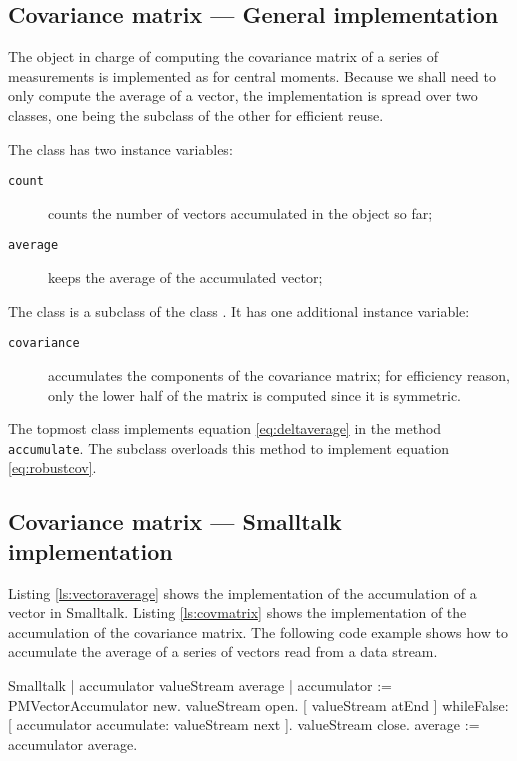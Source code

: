 \subsection{Covariance matrix --- General implementation}
 The
object in charge of computing the covariance matrix of a series of
measurements is implemented as for central moments. Because we
shall need to only compute the average of a vector, the
implementation is spread over two classes, one being the subclass
of the other for efficient reuse.

\noindent The class  has two instance
variables: {} {\parskip 0pt
\begin{description}
  \item[\texttt{count}] counts the number of vectors accumulated in the object so far;
  \item[\texttt{average}] keeps the average of the accumulated vector;
\end{description}
}

\noindent The class  is a subclass of
the class . It has one additional instance
variable: {} {\parskip 0pt
\begin{description}
  \item[\texttt{covariance}] accumulates the components of the covariance
  matrix; for efficiency reason, only the lower half of the matrix
  is computed since it is symmetric.
\end{description}
}

The topmost class implements equation \ref{eq:deltaverage} in the
method \texttt{accumulate}. The subclass overloads this method to
implement equation \ref{eq:robustcov}.

\subsection{Covariance matrix --- Smalltalk implementation}
\label{sec:scovmatrix} Listing \ref{ls:vectoraverage} shows the
implementation of the accumulation of a vector in Smalltalk.
Listing \ref{ls:covmatrix} shows the implementation of the
accumulation of the covariance matrix. The following code example
shows how to accumulate the average of a series of vectors read
from a data stream.

\begin{listing}{Smalltalk}
{ }
 | accumulator valueStream average |
 accumulator := PMVectorAccumulator new.
 valueStream open.
 [ valueStream atEnd ]
        whileFalse: [ accumulator accumulate: valueStream next ].
 valueStream close.
 average := accumulator average.
\end{listing}

